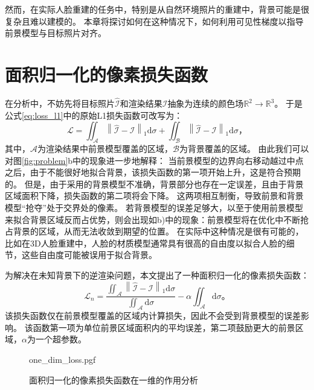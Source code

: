 然而，在实际人脸重建的任务中，特别是从自然环境照片的重建中，背景可能是很复杂且难以建模的。
本章将探讨如何在这种情况下，如何利用可见性梯度以指导前景模型与目标照片对齐。

\section{面积归一化的像素损失函数}

在分析中，不妨先将目标照片$\hat{\mathcal{I}}$和渲染结果$\mathcal{I}$抽象为连续的颜色场$\mathbb{R}^2 \to \mathbb{R}^3$。
于是公式\ref{eq:loss_l1}中的原始L1损失函数可改写为：
\begin{equation}
\mathcal{L} = \iint_{\mathcal{A}} \left\| \hat{\mathcal{I}} - \mathcal{I} \right\|_1 \mathrm{d}\sigma +
\iint_{\mathcal{B}} \left\| \hat{\mathcal{I}} - \mathcal{I} \right\|_1 \mathrm{d}\sigma
\text{，}
\label{eq:loss_l1_area}
\end{equation}
其中，$\mathcal{A}$为渲染结果中前景模型覆盖的区域，$\mathcal{B}$为背景覆盖的区域。
由此我们可以对图\ref{fig:problem}b中的现象进一步地解释：
当前景模型的边界向右移动越过中点之后，由于不能很好地拟合背景，该损失函数的第一项开始上升，这是符合预期的。
但是，由于采用的背景模型不准确，背景部分也存在一定误差，且由于背景区域面积下降，损失函数的第二项将会下降。
这两项相互制衡，导致前景和背景模型“抢夺”处于交界处的像素。
若背景模型的误差足够大，以至于使用前景模型来拟合背景区域反而占优势，则会出现如b)中的现象：前景模型将在优化中不断抢占背景的区域，从而无法收敛到期望的位置。
在实际中这种情况是很有可能的，比如在3D人脸重建中，人脸的材质模型通常具有很高的自由度以拟合人脸的细节，这些自由度可能被误用于拟合背景。

为解决在未知背景下的逆渲染问题，本文提出了一种面积归一化的像素损失函数：
\begin{equation}
\mathcal{L}_n = \frac{\iint_{\mathcal{A}} \left\| \hat{\mathcal{I}} - \mathcal{I} \right\|_1 \mathrm{d}\sigma}
{\iint_{\mathcal{A}}\mathrm{d}\sigma}
-\alpha\iint_{\mathcal{A}}\mathrm{d}\sigma
\text{。}
\label{eq:loss_n}
\end{equation}
该损失函数仅在前景模型覆盖的区域内计算损失，因此不会受到背景模型的误差影响。
该函数第一项为单位前景区域面积内的平均误差，第二项鼓励更大的前景区域，$\alpha$为一个超参数。

\begin{figure}
\centering
{one_dim_loss.pgf}
\caption{面积归一化的像素损失函数在一维的作用分析}
\label{fig:one_dim_loss}
\end{figure}

